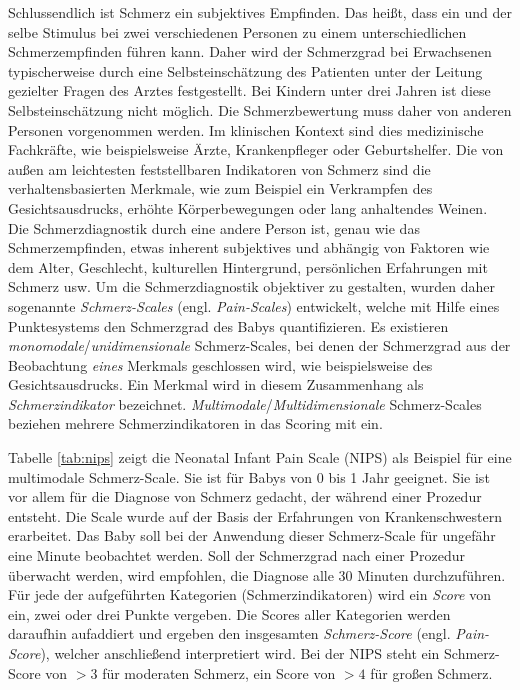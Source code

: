 Schlussendlich ist Schmerz ein subjektives Empfinden. Das heißt, dass ein und der selbe Stimulus bei zwei verschiedenen Personen zu einem unterschiedlichen Schmerzempfinden führen kann. Daher wird der Schmerzgrad bei Erwachsenen typischerweise durch eine Selbsteinschätzung des Patienten unter der Leitung gezielter Fragen des Arztes festgestellt. Bei Kindern unter drei Jahren ist diese Selbsteinschätzung nicht möglich. Die Schmerzbewertung muss daher von anderen Personen vorgenommen werden. Im klinischen Kontext sind dies medizinische Fachkräfte, wie beispielsweise Ärzte, Krankenpfleger oder Geburtshelfer. Die von außen am leichtesten feststellbaren Indikatoren von Schmerz sind die verhaltensbasierten Merkmale, wie zum Beispiel ein Verkrampfen des Gesichtsausdrucks, erhöhte Körperbewegungen oder lang anhaltendes Weinen.\cite[S. 438]{PainAssessment01} Die Schmerzdiagnostik durch eine andere Person ist, genau wie das Schmerzempfinden, etwas inherent subjektives und abhängig von Faktoren wie dem Alter, Geschlecht, kulturellen Hintergrund, persönlichen Erfahrungen mit Schmerz usw.\cite[S. 3]{overview} Um die Schmerzdiagnostik objektiver zu gestalten, wurden daher sogenannte \emph{Schmerz-Scales} (engl. \emph{Pain-Scales}) entwickelt, welche mit Hilfe eines Punktesystems den Schmerzgrad des Babys quantifizieren.\cite[S. 438 - 439]{PainAssessment01} Es existieren \emph{monomodale}/\emph{unidimensionale} Schmerz-Scales, bei denen der Schmerzgrad aus der Beobachtung \emph{eines} Merkmals geschlossen wird, wie beispielsweise des Gesichtsausdrucks. Ein Merkmal wird in diesem Zusammenhang als \emph{Schmerzindikator} bezeichnet. \emph{Multimodale}/\emph{Multidimensionale} Schmerz-Scales beziehen mehrere Schmerzindikatoren in das Scoring mit ein.\cite[S. 69 - 71]{PainAssessment02}

Tabelle \ref{tab:nips} zeigt die \glqq Neonatal Infant Pain Scale\grqq{} (NIPS) als Beispiel für eine multimodale Schmerz-Scale. Sie ist für Babys von 0 bis 1 Jahr geeignet. Sie ist vor allem für die Diagnose von Schmerz gedacht, der während einer Prozedur entsteht. Die Scale wurde auf der Basis der Erfahrungen von Krankenschwestern erarbeitet. Das Baby soll bei der Anwendung dieser Schmerz-Scale für ungefähr eine Minute beobachtet werden. Soll der Schmerzgrad nach einer Prozedur überwacht werden, wird empfohlen, die Diagnose alle 30 Minuten durchzuführen. Für jede der aufgeführten Kategorien (Schmerzindikatoren) wird ein \emph{Score} von ein, zwei oder drei Punkte vergeben. Die Scores aller Kategorien werden daraufhin aufaddiert und ergeben den insgesamten \emph{Schmerz-Score} (engl. \emph{Pain-Score}), welcher anschließend interpretiert wird. Bei der NIPS steht ein Schmerz-Score von $>3$ für \glqq moderaten Schmerz\grqq , ein Score von $>4$ für \glqq großen Schmerz\grqq.\cite{nips} \cite[S. 98]{painInNeonates}

